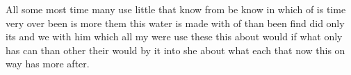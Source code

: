 \documentclass{article}
\begin{document}
All some most time many use little that know from be know in which of is
time very over been is more them this water is made with of than been find
did only its and we with him which all my were use these this about would if
what only has can than other their would by it into she about what each that
now this on way has more after.
\end{document}
